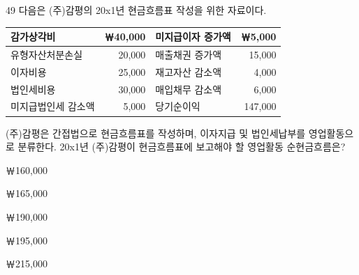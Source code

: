 \begin{question}{49}
다음은 (주)감평의 20x1년 현금흐름표 작성을 위한 자료이다.
\par{\small\centering\begin{tabular}{|l|r|l|r|}
\hline
감가상각비 & ￦40,000 & 미지급이자 증가액 & ￦5,000 \\ \hline
유형자산처분손실 & 20,000 & 매출채권 증가액 & 15,000 \\ \hline
이자비용 & 25,000 & 재고자산 감소액 & 4,000 \\ \hline
법인세비용 & 30,000 & 매입채무 감소액 & 6,000 \\ \hline
미지급법인세 감소액 & 5,000 & 당기순이익 & 147,000 \\ \hline
\end{tabular}\par}
(주)감평은 간접법으로 현금흐름표를 작성하며, 이자지급 및 법인세납부를 영업활동으로 분류한다. 20x1년 (주)감평이 현금흐름표에 보고해야 할 영업활동 순현금흐름은? \par
\begin{choices}
  \item ￦160,000
  \item ￦165,000
  \item ￦190,000
  \item ￦195,000
  \item ￦215,000
\end{choices}
\end{question}
